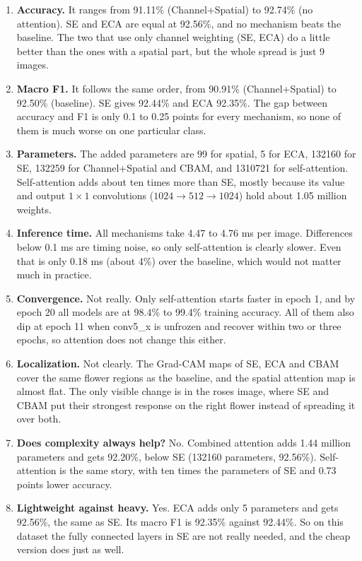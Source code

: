\documentclass[10pt]{article}
\begin{document}
\begin{enumerate}

\item \textbf{Accuracy.} It ranges from 91.11\% (Channel+Spatial) to 92.74\% (no attention). SE and ECA are equal at 92.56\%, and no mechanism beats the baseline. The two that use only channel weighting (SE, ECA) do a little better than the ones with a spatial part, but the whole spread is just 9 images.

\item \textbf{Macro F1.} It follows the same order, from 90.91\% (Channel+Spatial) to 92.50\% (baseline). SE gives 92.44\% and ECA 92.35\%. The gap between accuracy and F1 is only 0.1 to 0.25 points for every mechanism, so none of them is much worse on one particular class.

\item \textbf{Parameters.} The added parameters are 99 for spatial, 5 for ECA, 132160 for SE, 132259 for Channel+Spatial and CBAM, and 1310721 for self-attention. Self-attention adds about ten times more than SE, mostly because its value and output $1\times1$ convolutions ($1024\rightarrow512\rightarrow1024$) hold about 1.05 million weights.

\item \textbf{Inference time.} All mechanisms take 4.47 to 4.76 ms per image. Differences below 0.1 ms are timing noise, so only self-attention is clearly slower. Even that is only 0.18 ms (about 4\%) over the baseline, which would not matter much in practice.

\item \textbf{Convergence.} Not really. Only self-attention starts faster in epoch 1, and by epoch 20 all models are at 98.4\% to 99.4\% training accuracy. All of them also dip at epoch 11 when conv5\_x is unfrozen and recover within two or three epochs, so attention does not change this either.

\item \textbf{Localization.} Not clearly. The Grad-CAM maps of SE, ECA and CBAM cover the same flower regions as the baseline, and the spatial attention map is almost flat. The only visible change is in the roses image, where SE and CBAM put their strongest response on the right flower instead of spreading it over both.

\item \textbf{Does complexity always help?} No. Combined attention adds 1.44 million parameters and gets 92.20\%, below SE (132160 parameters, 92.56\%). Self-attention is the same story, with ten times the parameters of SE and 0.73 points lower accuracy.

\item \textbf{Lightweight against heavy.} Yes. ECA adds only 5 parameters and gets 92.56\%, the same as SE. Its macro F1 is 92.35\% against 92.44\%. So on this dataset the fully connected layers in SE are not really needed, and the cheap version does just as well.

\end{enumerate}
\end{document}
